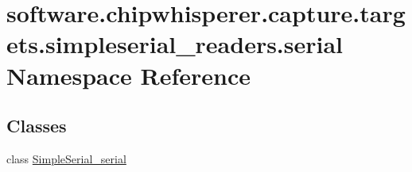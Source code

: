 \hypertarget{namespacesoftware_1_1chipwhisperer_1_1capture_1_1targets_1_1simpleserial__readers_1_1serial}{}\section{software.\+chipwhisperer.\+capture.\+targets.\+simpleserial\+\_\+readers.\+serial Namespace Reference}
\label{namespacesoftware_1_1chipwhisperer_1_1capture_1_1targets_1_1simpleserial__readers_1_1serial}
\subsection*{Classes}
\begin{DoxyCompactItemize}
\item 
class \hyperlink{classsoftware_1_1chipwhisperer_1_1capture_1_1targets_1_1simpleserial__readers_1_1serial_1_1SimpleSerial__serial}{Simple\+Serial\+\_\+serial}
\end{DoxyCompactItemize}
